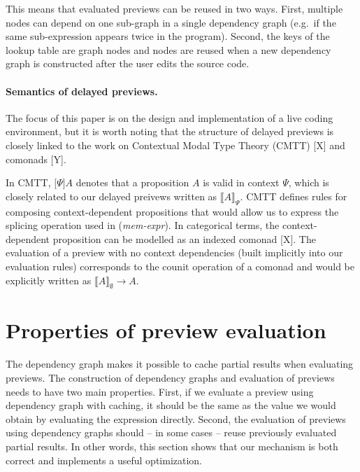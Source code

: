 \documentclass[sigplan,10pt]{acmart}\settopmatter{printfolios=true,printccs=false,printacmref=false}
\theoremstyle{plain}
\theoremstyle{definition}
\begin{document}
This means that evaluated previews can be reused in two ways. First, multiple nodes can 
depend on one sub-graph in a single dependency graph (e.g.~if the same sub-expression appears
twice in the program). Second, the keys of the lookup table are graph nodes and nodes are 
reused when a new dependency graph is constructed after the user edits the source code.

\paragraph{Semantics of delayed previews.}
The focus of this paper is on the design and implementation of a live coding environment, 
but it is worth noting that the structure of delayed previews is closely linked to the work
on Contextual Modal Type Theory (CMTT) [X] and comonads [Y]. 

In CMTT, $\lbrack \Psi \rbrack A$ denotes that a proposition $A$ is valid in context $\Psi$,
which is closely related to our delayed preivews written as $\llbracket A \rrbracket_\Psi$.
CMTT defines rules for composing context-dependent propositions that would allow us to express
the splicing operation used in (\emph{mem-expr}). In categorical terms, the context-dependent
proposition can be modelled as an indexed comonad [X]. The evaluation of a preview with no 
context dependencies (built implicitly into our evaluation rules) corresponds to the counit
operation of a comonad and would be explicitly written as $\llbracket A \rrbracket_\emptyset \rightarrow A$.


\newpage
\section{Properties of preview evaluation}
\label{sec:properties}

The dependency graph makes it possible to cache partial results when evaluating previews. 
The construction of dependency graphs and evaluation of previews needs to have two main properties.
First, if we evaluate a preview using dependency graph with caching, it should be the same as the
value we would obtain by evaluating the expression directly. Second, the evaluation of previews 
using dependency graphs should -- in some cases -- reuse previously evaluated partial results.
In other words, this section shows that our mechanism is both correct and implements a useful 
optimization. 
\end{document}
